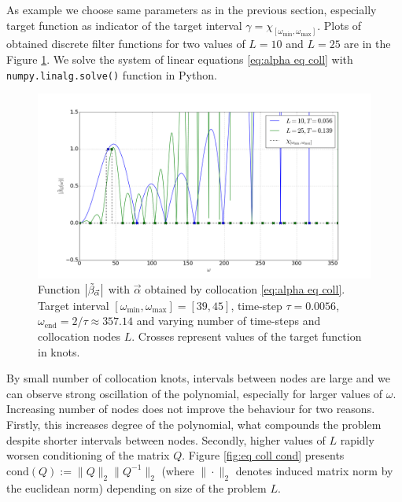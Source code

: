 \documentclass[a4paper,11pt,bibliography=totoc,listof=totoc,headinclude=true,cleardoublepage=empty,oneside]{scrbook}
\newcommand{\dffv}{\Tilde{\beta}_{\Vec{\alpha}}}
\newcommand{\e}{\mathrm{end}}
\begin{document}
As example we choose same parameters as in the previous section, especially target function as indicator of the target interval $\gamma = \chi_{\left[\omega_{\min}, \omega_{\max}\right]}$. Plots of obtained discrete filter functions for two values of $L = 10 $ and $L=25$ are in the Figure \ref{fig:eq coll beta}. We solve the system of linear equations \eqref{eq:alpha eq coll} with \texttt{numpy.linalg.solve()} function in Python. 

\begin{figure}[h]
    \centering
    \includegraphics[width=1\linewidth]{latex//images//equi_coll/Figure_1.png}
    \caption{Function $\left|\dffv\right|$ with $\Vec{\alpha}$ obtained by collocation \eqref{eq:alpha eq coll}. Target interval $\left[\omega_{\min}, \omega_{\max} \right] = [39, 45]$, time-step $\tau = 0.0056$, $\omega_\e = 2/\tau \approx 357.14$ and varying number of time-steps and collocation nodes $L$. Crosses represent values of the target function in knots. }
    \label{fig:eq coll beta}
\end{figure}

By small number of collocation knots, intervals between nodes are large and we can observe strong oscillation of the polynomial, especially for larger values of $\omega$. Increasing number of nodes does not improve the behaviour for two reasons. Firstly, this increases degree of the polynomial, what compounds the problem despite shorter intervals between nodes. Secondly, higher values of $L$ rapidly worsen conditioning of the matrix $Q$. Figure \ref{fig:eq coll cond} presents $\mathrm{cond}(Q) := \|Q\|_2 \|Q^{-1}\|_2$ (where $\| \cdot \|_2$ denotes induced matrix norm by the euclidean norm) depending on size of the problem $L$.
\end{document}
